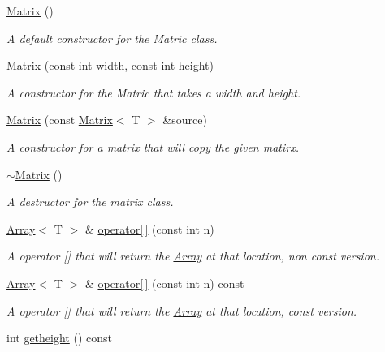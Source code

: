 \begin{DoxyCompactItemize}
\item 
\hyperlink{classMatrix_a9d567e3a121b1be0c3f9c461cab524fe}{Matrix} ()
\begin{DoxyCompactList}\small\item\em A default constructor for the Matric class. \end{DoxyCompactList}\item 
\hyperlink{classMatrix_a68e509be1c7d60985ab0e5f54f91092c}{Matrix} (const int width, const int height)
\begin{DoxyCompactList}\small\item\em A constructor for the Matric that takes a width and height. \end{DoxyCompactList}\item 
\hyperlink{classMatrix_abc1e84ee28720ecc8a6807bb3f09f43e}{Matrix} (const \hyperlink{classMatrix}{Matrix}$<$ T $>$ \&source)
\begin{DoxyCompactList}\small\item\em A constructor for a matrix that will copy the given matirx. \end{DoxyCompactList}\item 
\hyperlink{classMatrix_a91aa704de674203e96aece9e1955ccd3}{$\sim$\+Matrix} ()
\begin{DoxyCompactList}\small\item\em A destructor for the matrix class. \end{DoxyCompactList}\item 
\hyperlink{classArray}{Array}$<$ T $>$ \& \hyperlink{classMatrix_a765a80272dd217f6a743c446319fe9a2}{operator\mbox{[}$\,$\mbox{]}} (const int n)
\begin{DoxyCompactList}\small\item\em A operator \mbox{[}\mbox{]} that will return the \hyperlink{classArray}{Array} at that location, non const version. \end{DoxyCompactList}\item 
\hyperlink{classArray}{Array}$<$ T $>$ \& \hyperlink{classMatrix_aee569f8c95471c4cbc04a23da877ea0b}{operator\mbox{[}$\,$\mbox{]}} (const int n) const 
\begin{DoxyCompactList}\small\item\em A operator \mbox{[}\mbox{]} that will return the \hyperlink{classArray}{Array} at that location, const version. \end{DoxyCompactList}\item 
int \hyperlink{classMatrix_a23f1a63734d5ea0bbbf180ce6d0f73ff}{getheight} () const 

\end{DoxyCompactItemize}
